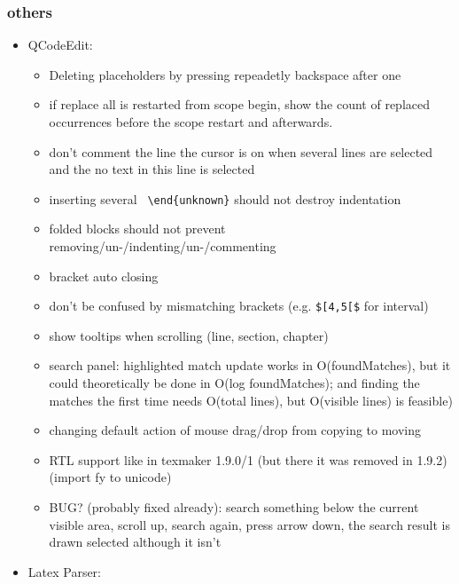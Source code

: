 \documentclass[10pt,a4paper,landscape]{report}
\begin{document}
\subsubsection{others}
\begin{itemize}
	\item QCodeEdit: \begin{itemize}
		\item Deleting placeholders by pressing repeadetly backspace after one
		\item if replace all is restarted from scope begin, show the count of replaced occurrences before the scope restart and afterwards.
		\item don't comment the line the cursor is on when several lines are selected and the no text in this line is selected
		\item %
		inserting several \verb+ \end{unknown}+ should not destroy indentation
		\item folded blocks should not prevent removing/un-/indenting/un-/commenting
		\item bracket auto closing
		\item don't be confused by mismatching brackets (e.g. \verb+$[4,5[$+ for interval)
%
%
%
%
		\item show tooltips when scrolling (line, section, chapter)
		\item search panel: highlighted match update works in O(foundMatches), but it could theoretically be done in O(log foundMatches);
		and finding the matches the first time needs O(total lines), but O(visible lines) is feasible)
		\item changing default action of mouse drag/drop from copying to moving
		\item RTL support like in texmaker 1.9.0/1 (but there it was removed in 1.9.2) (import fy to unicode)
		\item BUG? (probably fixed already): 
		search something below the current visible area, scroll up, search again, press arrow down, the search result is drawn selected although it isn't
	\end{itemize}
	\item Latex Parser: \begin{itemize}

\end{itemize}
\end{itemize}
\end{document}
